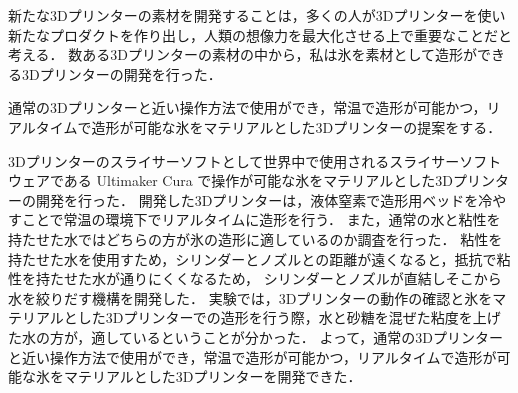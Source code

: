 新たな3Dプリンターの素材を開発することは，多くの人が3Dプリンターを使い新たなプロダクトを作り出し，人類の想像力を最大化させる上で重要なことだと考える．
数ある3Dプリンターの素材の中から，私は氷を素材として造形ができる3Dプリンターの開発を行った．

通常の3Dプリンターと近い操作方法で使用ができ，常温で造形が可能かつ，リアルタイムで造形が可能な氷をマテリアルとした3Dプリンターの提案をする．

3Dプリンターのスライサーソフトとして世界中で使用されるスライサーソフトウェアである Ultimaker Cura で操作が可能な氷をマテリアルとした3Dプリンターの開発を行った．
開発した3Dプリンターは，液体窒素で造形用ベッドを冷やすことで常温の環境下でリアルタイムに造形を行う．
また，通常の水と粘性を持たせた水ではどちらの方が氷の造形に適しているのか調査を行った．
粘性を持たせた水を使用すため，シリンダーとノズルとの距離が遠くなると，抵抗で粘性を持たせた水が通りにくくなるため，
シリンダーとノズルが直結しそこから水を絞りだす機構を開発した．
実験では，3Dプリンターの動作の確認と氷をマテリアルとした3Dプリンターでの造形を行う際，水と砂糖を混ぜた粘度を上げた水の方が，適しているということが分かった．
よって，通常の3Dプリンターと近い操作方法で使用ができ，常温で造形が可能かつ，リアルタイムで造形が可能な氷をマテリアルとした3Dプリンターを開発できた．
